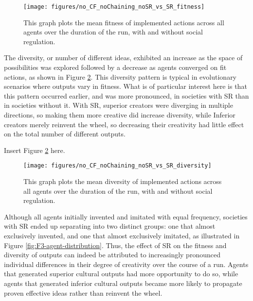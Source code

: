 \documentclass[a4paper,12pt,man,british]{apa6}
\begin{document}
\begin{figure}%
\centering
\texttt{[image: figures/no\_CF\_noChaining\_noSR\_vs\_SR\_fitness]}
\caption{This graph plots the mean fitness of implemented actions across all agents over the duration of the run, with and without social regulation.}
\label{fig:F1-no-CF-no-Chaining-fitness}
\end{figure}

The diversity, or number of different ideas, exhibited an increase as the space of possibilities was explored followed by a decrease as agents converged on fit actions, as shown in Figure \ref{fig:F2-no-CF-no-Chaining-diversity}. This diversity pattern is typical in evolutionary scenarios where outputs vary in fitness. What is of particular interest here is that this pattern occurred earlier, and was more pronounced, in societies with SR than in societies without it. With SR, superior creators were diverging in multiple directions, so making them more creative did increase diversity, while Inferior creators merely reinvent the wheel, so decreasing their creativity had little effect on the total number of different outputs. 

\begin{center} %
Insert Figure \ref{fig:F2-no-CF-no-Chaining-diversity} here.
\end{center}

\begin{figure}%
\centering
\texttt{[image: figures/no\_CF\_noChaining\_noSR\_vs\_SR\_diversity]}
\caption{This graph plots the mean diversity of implemented actions across all agents over the duration of the run, with and without social regulation.}
\label{fig:F2-no-CF-no-Chaining-diversity}
\end{figure}

Although all agents initially invented and imitated with equal frequency, societies with SR ended up separating into two distinct groups: one that almost exclusively invented, and one that almost exclusively imitated, as illustrated in Figure \ref{fig:F3-agent-distribution}. Thus, the effect of SR on the fitness and diversity of outputs can indeed be attributed to increasingly pronounced individual differences in their degree of creativity over the course of a run. Agents that generated superior cultural outputs had more opportunity to do so, while agents that generated inferior cultural outputs became more likely to propagate proven effective ideas rather than reinvent the wheel.
\end{document}
